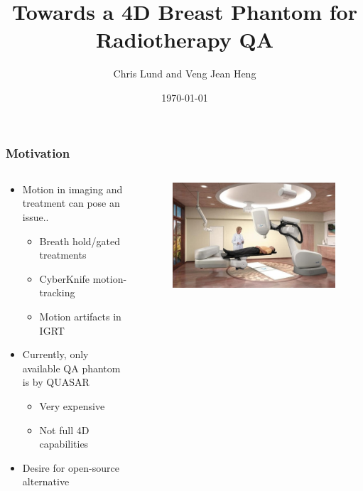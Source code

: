 \documentclass{beamer}
\title[4D Breast Phantom]{Towards a 4D Breast Phantom for Radiotherapy QA}
\author[C. Lund, V.J. Heng]{Chris Lund and Veng Jean Heng}
\institute[McGill MPU]{Medical Physics Unit \\ Department of Oncology, McGill University}
\date{\today}
\begin{document}
\begin{frame}

    \maketitle

\end{frame}

\begin{frame}

    \frametitle{Motivation}

    \begin{columns}
        \begin{column}{0.5\textwidth}
            \begin{itemize}
                \item Motion in imaging and treatment can pose an issue..
                    \begin{itemize}
                        \item Breath hold/gated treatments
                        \item CyberKnife motion-tracking
                        \item Motion artifacts in IGRT
                    \end{itemize}
                \vspace{1em}
                \item Currently, only available QA phantom is by QUASAR
                    \begin{itemize}
                        \item Very expensive
                        \item Not full 4D capabilities
                    \end{itemize}
                    \vspace{1em}
                \item Desire for open-source alternative
            \end{itemize}
        \end{column}
        \begin{column}{0.5\textwidth}
            \vspace*{-1.5em}
            \begin{figure}[h]
                \centering
                \includegraphics[width=0.9\columnwidth]{cyberknife.jpeg}

\end{figure}
\end{column}
\end{columns}
\end{frame}
\end{document}
